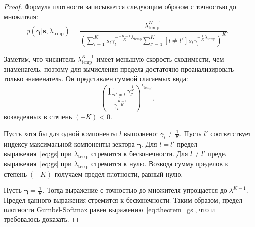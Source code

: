 \begin{proof} 
Формула плотности записывается следующим образом с точностью до множителя:
\[
    p(\boldsymbol{\gamma}|\mathbf{s}, {\lambda}_\text{temp}) =    \frac{\lambda_{\text{temp}}^{K-1}}{\left(\sum_{l=1}^K s_l\gamma_l^{-\frac{-K-1}{K}\lambda_\text{temp}}\sum_{l'=1}^K [l \neq l']s_l\gamma_l^{-\frac{1}{K}\lambda_\text{temp}}\right)^{K}}.
\]


Заметим, что числитель $\lambda_{\text{temp}}^{K-1}$ имеет меньшую скорость сходимости, чем знаменатель, поэтому для вычисления предела достаточно проанализировать только знаменатель. 
Он представлен суммой слагаемых вида:
\begin{equation}
\label{eq:gs}
    \left(\frac{\prod_{l' \neq l} \gamma_{l'}^{\frac{1}{K}}}{\gamma_l^{\frac{K-1}{K}}}\right)^{\lambda_{\text{temp}}},
\end{equation}
возведенных в степень $(-K)<0.$

Пусть хотя бы для одной компоненты $l$ выполнено: $\gamma_l \neq \frac{1}{K}$. Пусть $l'$ соответствует индексу максимальной компоненты вектора $\boldsymbol{\gamma}$.
Для $l=l'$ предел выражения~\eqref{eq:gs} при $\lambda_{\text{temp}}$ стремится к бесконечности. Для $l\neq l'$ предел выражения~\eqref{eq:gs} при $\lambda_{\text{temp}}$ стремится к нулю. Возводя сумму пределов в степень $(-K)$ получаем предел плотности, равный нулю.

Пусть $\boldsymbol{\gamma} = \frac{1}{K}$.
Тогда выражение с точностью до множителя упрощается до $\lambda^{K-1}$. Предел данного выражения стремится к бесконечности.
Таким образом, предел плотности Gumbel-Softmax равен выражению~\eqref{eq:theorem_gs}, что и требовалось доказать.

\end{proof}


